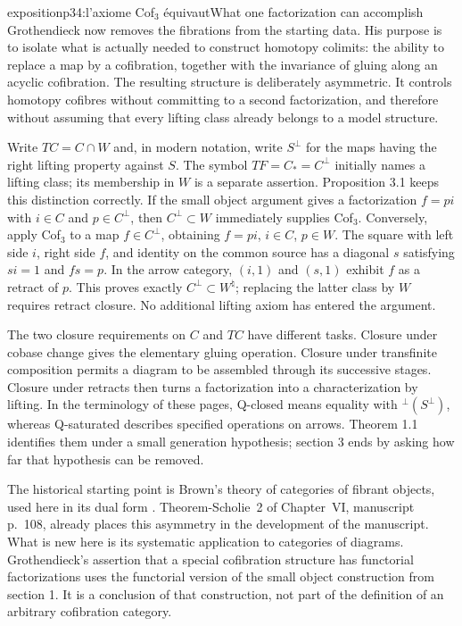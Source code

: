 \begin{dcomment}{exposition}{p34:l'axiome Cof$_3$ équivaut}{What one factorization can accomplish}
Grothendieck now removes the fibrations from the starting data. His purpose is to isolate what is actually needed to construct homotopy colimits: the ability to replace a map by a cofibration, together with the invariance of gluing along an acyclic cofibration. The resulting structure is deliberately asymmetric. It controls homotopy cofibres without committing to a second factorization, and therefore without assuming that every lifting class already belongs to a model structure.

Write $TC=C\cap W$ and, in modern notation, write $S^\perp$ for the maps having the right lifting property against $S$. The symbol $TF=C_* =C^\perp$ initially names a lifting class; its membership in $W$ is a separate assertion. Proposition 3.1 keeps this distinction correctly. If the small object argument gives a factorization $f=pi$ with $i\in C$ and $p\in C^\perp$, then $C^\perp\subset W$ immediately supplies Cof$_3$. Conversely, apply Cof$_3$ to a map $f\in C^\perp$, obtaining $f=pi$, $i\in C$, $p\in W$. The square with left side $i$, right side $f$, and identity on the common source has a diagonal $s$ satisfying $si=1$ and $fs=p$. In the arrow category, $(i,1)$ and $(s,1)$ exhibit $f$ as a retract of $p$. This proves exactly $C^\perp\subset W^{\natural}$; replacing the latter class by $W$ requires retract closure. No additional lifting axiom has entered the argument.

The two closure requirements on $C$ and $TC$ have different tasks. Closure under cobase change gives the elementary gluing operation. Closure under transfinite composition permits a diagram to be assembled through its successive stages. Closure under retracts then turns a factorization into a characterization by lifting. In the terminology of these pages, Q-closed means equality with ${}^\perp(S^\perp)$, whereas Q-saturated describes specified operations on arrows. Theorem 1.1 identifies them under a small generation hypothesis; section 3 ends by asking how far that hypothesis can be removed.

The historical starting point is Brown's theory of categories of fibrant objects, used here in its dual form \citep{Brown1973}. Theorem-Scholie~2 of Chapter~VI, manuscript p.~108, already places this asymmetry in the development of the manuscript. What is new here is its systematic application to categories of diagrams. Grothendieck's assertion that a special cofibration structure has functorial factorizations uses the functorial version of the small object construction from section 1. It is a conclusion of that construction, not part of the definition of an arbitrary cofibration category.
\end{dcomment}

